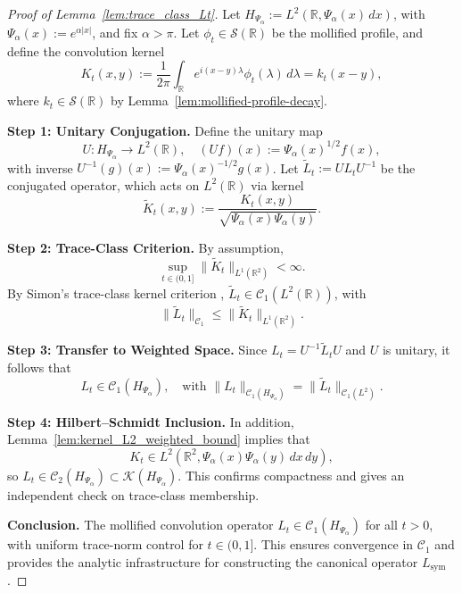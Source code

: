 \begin{proof}[Proof of Lemma~\ref{lem:trace_class_Lt}]
Let \( H_{\Psi_\alpha} := L^2(\mathbb{R}, \Psi_\alpha(x)\, dx) \), with \( \Psi_\alpha(x) := e^{\alpha |x|} \), and fix \( \alpha > \pi \). Let \( \phi_t \in \mathcal{S}(\mathbb{R}) \) be the mollified profile, and define the convolution kernel
\[
K_t(x,y) := \frac{1}{2\pi} \int_{\mathbb{R}} e^{i(x - y)\lambda} \phi_t(\lambda)\, d\lambda = k_t(x - y),
\]
where \( k_t \in \mathcal{S}(\mathbb{R}) \) by Lemma~\ref{lem:mollified-profile-decay}.

\medskip
\noindent\textbf{Step 1: Unitary Conjugation.}
Define the unitary map
\[
U \colon H_{\Psi_\alpha} \to L^2(\mathbb{R}), \quad (Uf)(x) := \Psi_\alpha(x)^{1/2} f(x),
\]
with inverse \( U^{-1}(g)(x) := \Psi_\alpha(x)^{-1/2} g(x) \). Let \( \widetilde{L}_t := U L_t U^{-1} \) be the conjugated operator, which acts on \( L^2(\mathbb{R}) \) via kernel
\[
\widetilde{K}_t(x,y) := \frac{K_t(x,y)}{\sqrt{\Psi_\alpha(x)\Psi_\alpha(y)}}.
\]

\medskip
\noindent\textbf{Step 2: Trace-Class Criterion.}
By assumption,
\[
\sup_{t \in (0,1]} \| \widetilde{K}_t \|_{L^1(\mathbb{R}^2)} < \infty.
\]
By Simon’s trace-class kernel criterion \cite[Thm.~4.2]{Simon2005TraceIdeals}, \( \widetilde{L}_t \in \mathcal{C}_1(L^2(\mathbb{R})) \), with
\[
\| \widetilde{L}_t \|_{\mathcal{C}_1} \le \| \widetilde{K}_t \|_{L^1(\mathbb{R}^2)}.
\]

\medskip
\noindent\textbf{Step 3: Transfer to Weighted Space.}
Since \( L_t = U^{-1} \widetilde{L}_t U \) and \( U \) is unitary, it follows that
\[
L_t \in \mathcal{C}_1(H_{\Psi_\alpha}), \quad \text{with } \| L_t \|_{\mathcal{C}_1(H_{\Psi_\alpha})} = \| \widetilde{L}_t \|_{\mathcal{C}_1(L^2)}.
\]

\medskip
\noindent\textbf{Step 4: Hilbert–Schmidt Inclusion.}
In addition, Lemma~\ref{lem:kernel_L2_weighted_bound} implies that
\[
K_t \in L^2(\mathbb{R}^2, \Psi_\alpha(x)\Psi_\alpha(y)\, dx\, dy),
\]
so \( L_t \in \mathcal{C}_2(H_{\Psi_\alpha}) \subset \mathcal{K}(H_{\Psi_\alpha}) \). This confirms compactness and gives an independent check on trace-class membership.

\medskip
\noindent\textbf{Conclusion.}
The mollified convolution operator \( L_t \in \mathcal{C}_1(H_{\Psi_\alpha}) \) for all \( t > 0 \), with uniform trace-norm control for \( t \in (0,1] \). This ensures convergence in \( \mathcal{C}_1 \) and provides the analytic infrastructure for constructing the canonical operator \( L_{\mathrm{sym}} \).
\end{proof}
